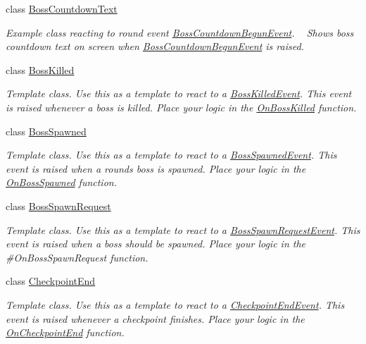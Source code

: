 \begin{DoxyCompactItemize}
class \hyperlink{class_round_manager_1_1_boss_countdown_text}{Boss\+Countdown\+Text}
\begin{DoxyCompactList}\small\item\em Example class reacting to round event \hyperlink{class_round_manager_1_1_events_1_1_boss_countdown_begun_event}{Boss\+Countdown\+Begun\+Event}. ~\newline
Shows boss countdown text on screen when \hyperlink{class_round_manager_1_1_events_1_1_boss_countdown_begun_event}{Boss\+Countdown\+Begun\+Event} is raised. \end{DoxyCompactList}\item 
class \hyperlink{class_round_manager_1_1_boss_killed}{Boss\+Killed}
\begin{DoxyCompactList}\small\item\em Template class. Use this as a template to react to a \hyperlink{class_round_manager_1_1_events_1_1_boss_killed_event}{Boss\+Killed\+Event}. This event is raised whenever a boss is killed. Place your logic in the \hyperlink{class_round_manager_1_1_boss_killed_a6b8d67c8093c04bada8d2cf68854247c}{On\+Boss\+Killed} function. \end{DoxyCompactList}\item 
class \hyperlink{class_round_manager_1_1_boss_spawned}{Boss\+Spawned}
\begin{DoxyCompactList}\small\item\em Template class. Use this as a template to react to a \hyperlink{class_round_manager_1_1_events_1_1_boss_spawned_event}{Boss\+Spawned\+Event}. This event is raised when a rounds boss is spawned. Place your logic in the \hyperlink{class_round_manager_1_1_boss_spawned_ae1391ac6a4e82aeee73c55b1db02ebda}{On\+Boss\+Spawned} function. \end{DoxyCompactList}\item 
class \hyperlink{class_round_manager_1_1_boss_spawn_request}{Boss\+Spawn\+Request}
\begin{DoxyCompactList}\small\item\em Template class. Use this as a template to react to a \hyperlink{class_round_manager_1_1_events_1_1_boss_spawn_request_event}{Boss\+Spawn\+Request\+Event}. This event is raised when a boss should be spawned. Place your logic in the \#\+On\+Boss\+Spawn\+Request function. \end{DoxyCompactList}\item 
class \hyperlink{class_round_manager_1_1_checkpoint_end}{Checkpoint\+End}
\begin{DoxyCompactList}\small\item\em Template class. Use this as a template to react to a \hyperlink{class_round_manager_1_1_events_1_1_checkpoint_end_event}{Checkpoint\+End\+Event}. This event is raised whenever a checkpoint finishes. Place your logic in the \hyperlink{class_round_manager_1_1_checkpoint_end_acd74137784d3b7e6bee8db735abac53d}{On\+Checkpoint\+End} function. \end{DoxyCompactList}\item 

\end{DoxyCompactItemize}
